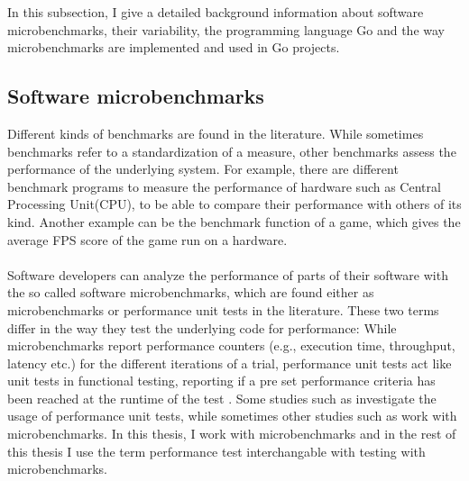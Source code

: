 \documentclass{seal_thesis}
\begin{document}
In this subsection, I give a detailed background information about software microbenchmarks, their variability, the programming language Go and the way microbenchmarks are implemented and used in Go projects.

\subsection{Software microbenchmarks}

Different kinds of benchmarks are found in the literature. While sometimes benchmarks refer to a standardization of a measure, other benchmarks assess the performance of the underlying system. For example, there are different benchmark programs to measure the performance of hardware such as Central Processing Unit(CPU), to be able to compare their performance with others of its kind. Another example can be the benchmark function of a game, which gives the average FPS score of the game run on a hardware.\\
\\
Software developers can analyze the performance of parts of their software with the so called software microbenchmarks, which are found either as microbenchmarks or performance unit tests in the literature\cite{costa2019}. These two terms differ in the way they test the underlying code for performance: While microbenchmarks report performance counters (e.g., execution time, throughput, latency etc.) for the different iterations of a trial, performance unit tests act like unit tests in functional testing, reporting if a pre set performance criteria has been reached at the runtime of the test \cite{costa2019}. Some studies such as \cite{Stefan:2017:UTP:3030207.3030226}\cite{Horky:2015:UPU:2668930.2688051} investigate the usage of performance unit tests, while sometimes other studies such as \cite{Laaber:2018:EOS:3196398.3196407}\cite{rodriguez2016automatic} work with microbenchmarks. In this thesis, I work with microbenchmarks and in the rest of this thesis I use the term performance test interchangable with testing with microbenchmarks.\\
\\
\end{document}
